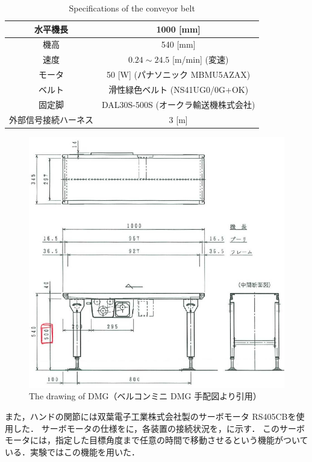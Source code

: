 \documentclass[a4paper,twoside,12pt,papersize, dvipdfmx]{iirthesis}
\begin{document}
\begin{table}[b]
    \centering
    \caption{Specifications of the conveyor belt \cite{kamikukita2022}}
    \begin{tabular}{|c|c|}
    \hline
    水平機長 & 1000 [mm] \\
    \hline
    機高 & 540 [mm] \\
    \hline
    速度 & $0.24 \sim 24.5$ [m/min] (変速)\\
    \hline
    モータ & 50 [W] (パナソニック MBMU5AZAX) \\
    \hline
    ベルト & 滑性緑色ベルト (NS41UG0/0G+OK) \\
    \hline
    固定脚 & DAL30S-500S (オークラ輸送機株式会社)\\
    \hline
    外部信号接続ハーネス & 3 [m] \\
    \hline
    \end{tabular}
    \label{Specifications of the conveyor belt}
\end{table}
\begin{figure}[htbp]
    \centering
    \includegraphics[width=.8\columnwidth, clip]{fig/4-manipulation-result/blueprint.pdf}
    \caption{The drawing of DMG（ベルコンミニ DMG 手配図より引用）}
    \label{The drawing of DMG}
\end{figure}

また，ハンドの関節には双葉電子工業株式会社製のサーボモータ RS405CBを使用した．
サーボモータの仕様をに，各装置の接続状況を，に示す．
このサーボモータには，指定した目標角度まで任意の時間で移動させるという機能がついている．実験ではこの機能を用いた．
\end{document}
